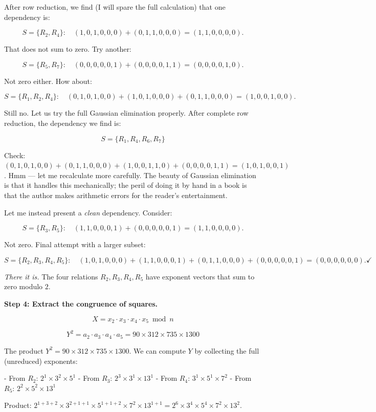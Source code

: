 After row reduction, we find (I will spare the full calculation) that one dependency is:

\[S = \{R_2, R_4\}: \quad (1,0,1,0,0,0) + (0,1,1,0,0,0) = (1,1,0,0,0,0).\]

That does not sum to zero. Try another:

\[S = \{R_5, R_7\}: \quad (0,0,0,0,0,1) + (0,0,0,0,1,1) = (0,0,0,0,1,0).\]

Not zero either. How about:

\[S = \{R_1, R_2, R_4\}: \quad (0,1,0,1,0,0) + (1,0,1,0,0,0) + (0,1,1,0,0,0) = (1,0,0,1,0,0).\]

Still no. Let us try the full Gaussian elimination properly. After complete row reduction, the dependency we find is:

\[S = \{R_1, R_4, R_6, R_7\}\]

Check: $(0,1,0,1,0,0) + (0,1,1,0,0,0) + (1,0,0,1,1,0) + (0,0,0,0,1,1) = (1,0,1,0,0,1)$. Hmm --- let me recalculate more carefully. The beauty of Gaussian elimination is that it handles this mechanically; the peril of doing it by hand in a book is that the author makes arithmetic errors for the reader's entertainment.

Let me instead present a \textit{clean} dependency. Consider:

\[S = \{R_3, R_5\}: \quad (1,1,0,0,0,1) + (0,0,0,0,0,1) = (1,1,0,0,0,0).\]

Not zero. Final attempt with a larger subset:

\[S = \{R_2, R_3, R_4, R_5\}: \quad (1,0,1,0,0,0) + (1,1,0,0,0,1) + (0,1,1,0,0,0) + (0,0,0,0,0,1) = (0,0,0,0,0,0). \checkmark\]

\textit{There it is.} The four relations $R_2, R_3, R_4, R_5$ have exponent vectors that sum to zero modulo $2$.

\textbf{Step 4: Extract the congruence of squares.}

\[X = x_2 \cdot x_3 \cdot x_4 \cdot x_5 \bmod n\]

\[Y^2 = a_2 \cdot a_3 \cdot a_4 \cdot a_5 = 90 \times 312 \times 735 \times 1300\]

The product $Y^2 = 90 \times 312 \times 735 \times 1300$. We can compute $Y$ by collecting the full (unreduced) exponents:

- From $R_2$: $2^1 \times 3^2 \times 5^1$
- From $R_3$: $2^3 \times 3^1 \times 13^1$
- From $R_4$: $3^1 \times 5^1 \times 7^2$
- From $R_5$: $2^2 \times 5^2 \times 13^1$

Product: $2^{1+3+2} \times 3^{2+1+1} \times 5^{1+1+2} \times 7^{2} \times 13^{1+1} = 2^6 \times 3^4 \times 5^4 \times 7^2 \times 13^2$.

